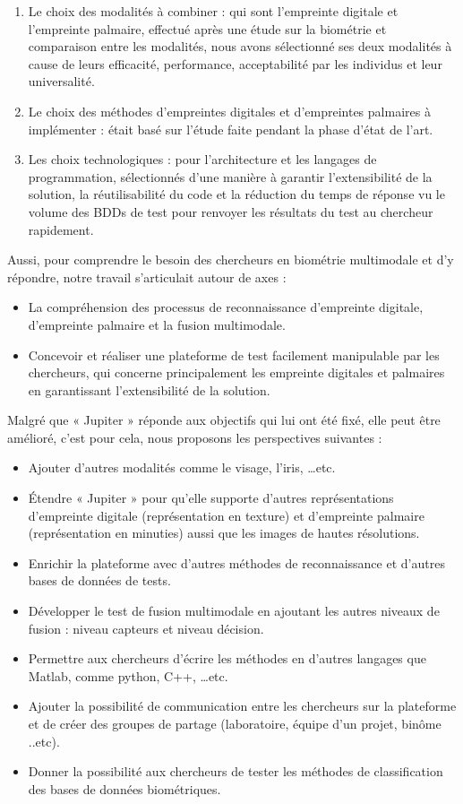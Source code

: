 \begin{enumerate}
\item Le choix des modalités à combiner : qui sont l’empreinte digitale et l’empreinte palmaire, effectué après une étude sur la biométrie et comparaison entre les modalités, nous avons sélectionné ses deux modalités à cause de leurs efficacité, performance, acceptabilité par les individus et leur universalité.

	\item Le choix des méthodes d’empreintes digitales et d’empreintes palmaires à implémenter : était basé sur l’étude faite pendant la phase d'état de l’art.
\item Les choix technologiques : pour l’architecture et les langages de programmation, sélectionnés d’une manière à garantir l’extensibilité de la solution, la réutilisabilité du code  et la réduction du temps de réponse vu le volume des BDDs de test pour renvoyer les résultats du test au chercheur rapidement.
\end{enumerate}
Aussi, pour comprendre le besoin des chercheurs en biométrie multimodale et d’y répondre, notre travail s’articulait autour de axes :
\begin{itemize}
	\item La compréhension des processus de reconnaissance d’empreinte digitale, d’empreinte palmaire et la fusion multimodale.
	\item Concevoir et réaliser une plateforme de test facilement manipulable par les chercheurs, qui concerne principalement les empreinte digitales et palmaires en garantissant l’extensibilité de la solution.
\end{itemize}
Malgré que « Jupiter » réponde aux objectifs qui lui ont été fixé, elle peut être amélioré, c’est pour cela, nous proposons les perspectives suivantes :
\begin{itemize}
	\item Ajouter d’autres modalités comme le visage, l’iris, …etc.
	\item Étendre « Jupiter » pour qu’elle supporte d’autres représentations d’empreinte digitale (représentation en texture) et d’empreinte palmaire (représentation en minuties) aussi que les images de hautes résolutions.

	\item Enrichir la plateforme avec d’autres méthodes de reconnaissance et d’autres bases de données de tests.
	\item Développer le test de fusion multimodale en ajoutant les autres niveaux de fusion : niveau capteurs et niveau décision.
    \item Permettre aux chercheurs d’écrire les méthodes en d’autres langages que Matlab, comme python, C++, …etc.
    \item Ajouter la possibilité de communication entre les chercheurs sur la plateforme et de créer des groupes de partage (laboratoire, équipe d’un projet, binôme ..etc).

    \item Donner la possibilité aux chercheurs de tester les méthodes de classification des bases de données biométriques.
\end{itemize}











